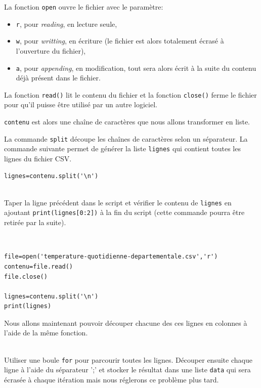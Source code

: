 La fonction \verb?open? ouvre le fichier avec le paramètre:
\begin{itemize}
\item \verb?r?, pour \textit{reading}, en lecture seule,
\item \verb?w?, pour \textit{writting}, en écriture (le fichier est alors totalement écrasé à l'ouverture du fichier),
\item \verb?a?, pour \textit{appending}, en modification, tout sera alors écrit à la suite du contenu déjà présent dans le fichier.
\end{itemize}

La fonction \verb?read()? lit le contenu du fichier et la fonction \verb?close()? ferme le fichier pour qu'il puisse être utilisé par un autre logiciel.

\verb?contenu? est alors une chaîne de caractères que nous allons transformer en liste.

La commande \verb?split? découpe les chaînes de caractères selon un séparateur. La commande suivante permet de générer la liste \verb?lignes? qui contient toutes les lignes du fichier CSV.

\begin{verbatim}
lignes=contenu.split('\n')
\end{verbatim}

\begin{exercice}~\\
Taper la ligne précédent dans le script et vérifier le contenu de \verb?lignes? en ajoutant \verb?print(lignes[0:2])? à la fin du script (cette commande pourra être retirée par la suite).
\end{exercice}

\begin{solution}~\ \\
\begin{verbatim}
file=open('temperature-quotidienne-departementale.csv','r')
contenu=file.read()
file.close()

lignes=contenu.split('\n')
print(lignes)
\end{verbatim}
\end{solution}

Nous allons maintenant pouvoir découper chacune des ces lignes en colonnes à l'aide de la même fonction.

\begin{exercice}~\\
Utiliser une boule \verb?for? pour parcourir toutes les lignes. Découper ensuite chaque ligne à l'aide du séparateur ';' et stocker le résultat dans une liste \verb?data? qui sera écrasée à chaque itération mais nous réglerons ce problème plus tard.
\end{exercice}

